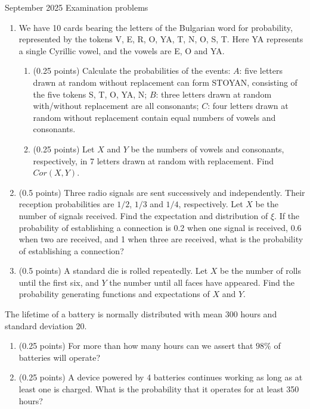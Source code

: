 \documentclass[a4paper]{report}
\begin{document}
 September 2025 \hfill Examination problems
\hrulefill
\begin{problem}
\begin{enumerate}
\item We have 10 cards bearing the letters of the Bulgarian word for probability, represented by the tokens V, E, R, O, YA, T, N, O, S, T. Here YA represents a single Cyrillic vowel, and the vowels are E, O and YA.
\begin{enumerate}
\item (0.25 points) Calculate the probabilities of the events:
$A$: five letters drawn at random without replacement can form STOYAN, consisting of the five tokens S, T, O, YA, N;
$B$: three letters drawn at random with/without replacement are all consonants;
$C$: four letters drawn at random without replacement contain equal numbers of vowels and consonants.
\item (0.25 points) Let $X$ and $Y$ be the numbers of vowels and consonants, respectively, in 7 letters drawn at random with replacement. Find $Cor(X,Y)$.
\end{enumerate}
\item (0.5 points) Three radio signals are sent successively and independently. Their reception probabilities are $1/2$, $1/3$ and $1/4$, respectively. Let $X$ be the number of signals received. Find the expectation and distribution of $\xi$. If the probability of establishing a connection is 0.2 when one signal is received, 0.6 when two are received, and 1 when three are received, what is the probability of establishing a connection?
\item (0.5 points) A standard die is rolled repeatedly. Let $X$ be the number of rolls until the first six, and $Y$ the number until all faces have appeared. Find the probability generating functions and expectations of $X$ and $Y$.
\end{enumerate}
\end{problem}
\begin{problem}
The lifetime of a battery is normally distributed with mean 300 hours and standard deviation 20.
\begin{enumerate}
\item (0.25 points) For more than how many hours can we assert that $98\%$ of batteries will operate?
\item (0.25 points) A device powered by 4 batteries continues working as long as at least one is charged. What is the probability that it operates for at least 350 hours?
\end{enumerate}
\end{problem}
\end{document}
